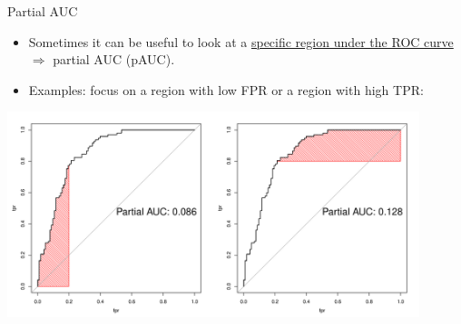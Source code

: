 \documentclass[11pt,compress,t,notes=noshow, xcolor=table]{beamer}
\newenvironment{knitrout}{}{} %
\begin{document}
\begin{vbframe}{Partial AUC}
\begin{itemize}
  \item Sometimes it can be useful to look at a \href{http://journals.sagepub.com/doi/pdf/10.1177/0272989X8900900307}{specific region under the ROC curve}  $\Rightarrow$ partial AUC (pAUC).
  \item Examples: focus on a region with low FPR or a region with high TPR:
\end{itemize}

\begin{knitrout}\scriptsize
{}\color{fgcolor}

{\centering \includegraphics[width=0.9\textwidth]{figure/eval_mclass_roc_sp_13}

}



\end{knitrout}

\end{vbframe}




\endlecture
\end{document}
